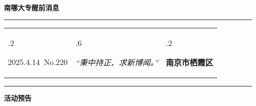 \documentclass[letterpaper, 12pt]{article}
\begin{document}
\begin{center}
    \Huge\textbf{南哪大专醒前消息}
\end{center}
\vspace{4mm}
\hrule
\renewcommand\tabularxcolumn[1]{m{#1}}
\begin{tabularx}{\textwidth}{>{\hsize.2\hsize}X>{\hsize.6\hsize}X>{\hsize.2\hsize}X}
    \begin{flushleft}
        2025.4.14\, No.220
    \end{flushleft}
    &
    \begin{center}
        \textit{“秉中持正、求新博闻。”}
    \end{center}
    &
    \begin{flushright}
        \textbf{南京市栖霞区}
    \end{flushright}
\end{tabularx}
\vspace{-3.5mm}
\hrule
\vspace{4mm}
\centerline{\huge\textbf{活动预告}}
\end{document}
